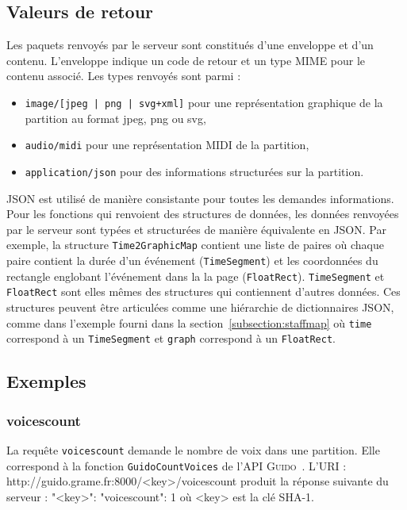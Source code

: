\documentclass{article}
\newenvironment{code}		{\vspace{-2mm} \fontsize{8.5pt}{12pt}\selectfont \verbatim}{\endverbatim\vspace{-2mm}}
\newenvironment{mcode}		{\vspace{-2mm} \fontsize{10pt}{12pt}\selectfont \verbatim}{\endverbatim\vspace{-2mm}}
\newcommand{\icode}[1]		{{\small \texttt{#1}}}
\newcommand{\guido}		{\textsc{Guido}}
\begin{document}
\subsection{Valeurs de retour}\label{subsection:values}
Les paquets renvoyés par le serveur sont constitués d'une enveloppe et d'un contenu. L'enveloppe indique un code de retour et un type MIME pour le contenu associé. Les types renvoyés sont parmi :
\begin{itemize}
\item \icode{image/[jpeg | png | svg+xml]} pour une représentation graphique de la partition au format jpeg, png ou svg,
\item \icode{audio/midi} pour une représentation MIDI de la partition, 
\item \icode{application/json} pour des informations structurées sur la partition.
\end{itemize}
JSON est utilisé de manière consistante pour toutes les demandes informations. Pour les fonctions qui renvoient des structures de données, les données renvoyées par le serveur sont typées et structurées de manière équivalente en JSON.
Par exemple, la structure \verb=Time2GraphicMap= contient une liste de paires où chaque paire contient la durée d'un événement (\verb=TimeSegment=) et les coordonnées du rectangle englobant l'événement dans la la page (\verb=FloatRect=). \verb=TimeSegment= et \verb=FloatRect= sont elles mêmes des structures qui contiennent d'autres données. Ces structures peuvent être articulées comme une hiérarchie de dictionnaires JSON, comme dans l'exemple fourni dans la section~\ref{subsection:staffmap} où \verb=time= correspond à un \break \verb=TimeSegment= et \verb=graph= correspond à un \verb=FloatRect=.

\subsection{Exemples}
\subsubsection{voicescount}
La requête \verb=voicescount= demande le nombre de voix dans une partition. Elle correspond à la fonction \verb=GuidoCountVoices= de l'API \guido\ . L'URI :
\begin{code}
  http://guido.grame.fr:8000/<key>/voicescount
\end{code}
produit la réponse suivante du serveur :
\begin{mcode}
  {
    "<key>": {
      "voicescount": 1
    }
  }
\end{mcode}
où <key> est la clé SHA-1.
\end{document}
